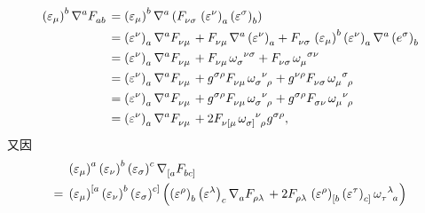\begin{xiti}
\begin{jie}
		\begin{align*}
			\tensor{\left( \varepsilon_\mu \right)}{^b} \tensor{\nabla}{^a} \tensor{F}{_a_b} &= \tensor{\left( \varepsilon_\mu \right)}{^b} \tensor{\nabla}{^a} \left( \tensor{F}{_\nu_\sigma} \tensor{\left( \varepsilon^\nu \right)}{_a} \tensor{\left( \varepsilon^\sigma \right)}{_b} \right)\\
			&= \tensor{\left( \varepsilon^\nu \right)}{_a} \tensor{\nabla}{^a} \tensor{F}{_\nu_\mu} + \tensor{F}{_\nu_\mu} \tensor{\nabla}{^a} \tensor{\left( \varepsilon^\nu \right)}{_a} + \tensor{F}{_\nu_\sigma} \tensor{\left( \varepsilon_\mu \right)}{^b} \tensor{\left( \varepsilon^\nu \right)}{_a} \tensor{\nabla}{^a} \tensor{\left( e^\sigma \right)}{_b}\\
			&= \tensor{\left( \varepsilon^\nu \right)}{_a} \tensor{\nabla}{^a} \tensor{F}{_\nu_\mu} + \tensor{F}{_\nu_\mu} \tensor{\omega}{_\sigma^\nu^\sigma} + \tensor{F}{_\nu_\sigma} \tensor{\omega}{_\mu^\sigma^\nu}\\
			&= \tensor{\left( \varepsilon^\nu \right)}{_a} \tensor{\nabla}{^a} \tensor{F}{_\nu_\mu} + \tensor{g}{^\sigma^\rho} \tensor{F}{_\nu_\mu} \tensor{\omega}{_\sigma^\nu_\rho} + \tensor{g}{^\nu^\rho} \tensor{F}{_\nu_\sigma} \tensor{\omega}{_\mu^\sigma_\rho}\\
			&= \tensor{\left( \varepsilon^\nu \right)}{_a} \tensor{\nabla}{^a} \tensor{F}{_\nu_\mu} + \tensor{g}{^\sigma^\rho} \tensor{F}{_\nu_\mu} \tensor{\omega}{_\sigma^\nu_\rho} + \tensor{g}{^\sigma^\rho} \tensor{F}{_\sigma_\nu} \tensor{\omega}{_\mu^\nu_\rho}\\
			&= \tensor{\left( \varepsilon^\nu \right)}{_a} \tensor{\nabla}{^a} \tensor{F}{_\nu_\mu} + 2 \tensor{F}{_\nu_{[\mu}} \tensor{\omega}{_{\sigma]}^\nu_\rho} \tensor{g}{^\sigma^\rho},
		\end{align*}
		又因
		\begin{align*}
			&\tensor{\left( \varepsilon_\mu \right)}{^a} \tensor{\left( \varepsilon_\nu \right)}{^b} \tensor{\left( \varepsilon_\sigma \right)}{^c} \tensor{\nabla}{_{[a}} \tensor{F}{_{bc]}}\\
			={}& \tensor{\left( \varepsilon_\mu \right)}{^{[a}} \tensor{\left( \varepsilon_\nu \right)}{^b} \tensor{\left( \varepsilon_\sigma \right)}{^{c]}} \left( \tensor{\left( \varepsilon^\rho \right)}{_b} \tensor{\left( \varepsilon^\lambda \right)}{_c} \tensor{\nabla}{_a} \tensor{F}{_\rho_\lambda} + 2 \tensor{F}{_\rho_\lambda} \tensor{\left( \varepsilon^\rho \right)}{_{[b}} \tensor{\left( \varepsilon^\tau \right)}{_{c]}} \tensor{\omega}{_\tau^\lambda_a} \right)\\

\end{align*}
\end{jie}
\end{xiti}
